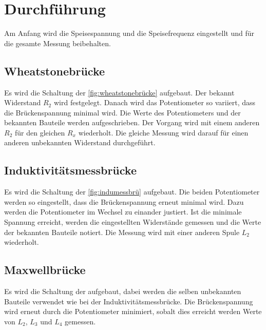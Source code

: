 \section{Durchführung}
\label{sec:Durchführung}
Am Anfang wird die Speisespannung und die Speisefrequenz eingestellt und für die gesamte Messung beibehalten.
\subsection{Wheatstonebrücke}

Es wird die Schaltung der \autoref{fig:wheatstonebrücke} aufgebaut.
Der bekannt Widerstand $R_2$ wird festgelegt. Danach wird das Potentiometer so variiert, dass die Brückenspannung minimal wird.
Die Werte des Potentiometers und der bekannten Bauteile werden aufgeschrieben.
Der Vorgang wird mit einem anderen $R_2$ für den gleichen $R_x$ wiederholt.
Die gleiche Messung wird darauf für einen anderen unbekannten Widerstand durchgeführt.

\subsection{Induktivitätsmessbrücke}
Es wird die Schaltung der \autoref{fig:indumessbrü} aufgebaut. Die beiden Potentiometer werden so eingestellt, dass die Brückenspannung erneut minimal wird. Dazu werden die Potentiometer im Wechsel zu einander justiert.
Ist die minimale Spannung erreicht, werden die eingestellten Widerstände gemessen und die Werte der bekannten Bauteile notiert.
Die Messung wird mit einer anderen Spule $L_2$ wiederholt.

\subsection{Maxwellbrücke}
Es wird die Schaltung der 
aufgebaut, dabei werden die selben unbekannten Bauteile verwendet wie bei der Induktivitätsmessbrücke.
Die Brückenspannung wird erneut durch die Potentiometer minimiert, sobalt dies erreicht werden Werte von $L_2$, $L_3$ und $L_4$ gemessen.

